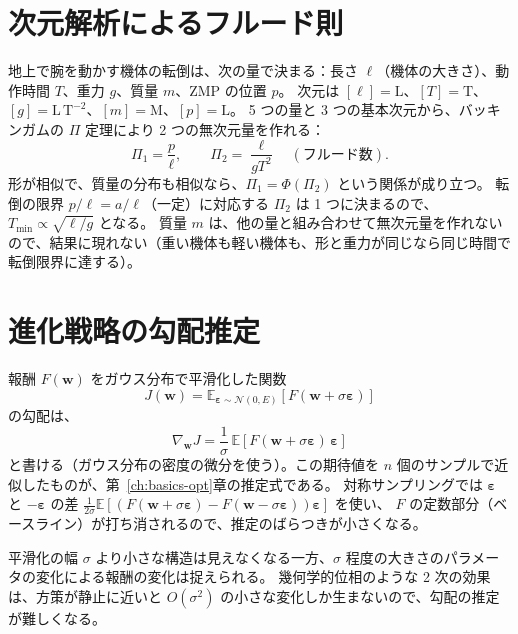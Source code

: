 \section{次元解析によるフルード則}

地上で腕を動かす機体の転倒は、次の量で決まる：長さ $\ell$（機体の大きさ）、動作時間 $T$、重力 $g$、質量 $m$、ZMP の位置 $p$。
次元は $[\ell]=\mathrm{L}$、$[T]=\mathrm{T}$、$[g]=\mathrm{L\,T^{-2}}$、$[m]=\mathrm{M}$、$[p]=\mathrm{L}$。
5 つの量と 3 つの基本次元から、バッキンガムの $\Pi$ 定理により 2 つの無次元量を作れる：
\begin{equation}
\Pi_1 = \frac{p}{\ell},\qquad \Pi_2 = \frac{\ell}{gT^2}\quad(\text{フルード数}).
\end{equation}
形が相似で、質量の分布も相似なら、$\Pi_1 = \Phi(\Pi_2)$ という関係が成り立つ。
転倒の限界 $p/\ell = a/\ell$（一定）に対応する $\Pi_2$ は 1 つに決まるので、$T_{\min}\propto\sqrt{\ell/g}$ となる。
質量 $m$ は、他の量と組み合わせて無次元量を作れないので、結果に現れない（重い機体も軽い機体も、形と重力が同じなら同じ時間で転倒限界に達する）。

\section{進化戦略の勾配推定}

報酬 $F(\bm w)$ をガウス分布で平滑化した関数
\[
J(\bm w) = \mathbb E_{\bm\varepsilon\sim\mathcal N(0,E)}\left[F(\bm w+\sigma\bm\varepsilon)\right]
\]
の勾配は、
\begin{equation}
\nabla_{\bm w}J = \frac{1}{\sigma}\,\mathbb E\left[F(\bm w+\sigma\bm\varepsilon)\,\bm\varepsilon\right]
\end{equation}
と書ける（ガウス分布の密度の微分を使う）。この期待値を $n$ 個のサンプルで近似したものが、第~\ref{ch:basics-opt}章の推定式である。
対称サンプリングでは $\bm\varepsilon$ と $-\bm\varepsilon$ の差 $\frac{1}{2\sigma}\mathbb E[(F(\bm w+\sigma\bm\varepsilon)-F(\bm w-\sigma\bm\varepsilon))\bm\varepsilon]$ を使い、
$F$ の定数部分（ベースライン）が打ち消されるので、推定のばらつきが小さくなる。

平滑化の幅 $\sigma$ より小さな構造は見えなくなる一方、$\sigma$ 程度の大きさのパラメータの変化による報酬の変化は捉えられる。
幾何学的位相のような 2 次の効果は、方策が静止に近いと $O(\sigma^2)$ の小さな変化しか生まないので、勾配の推定が難しくなる。
